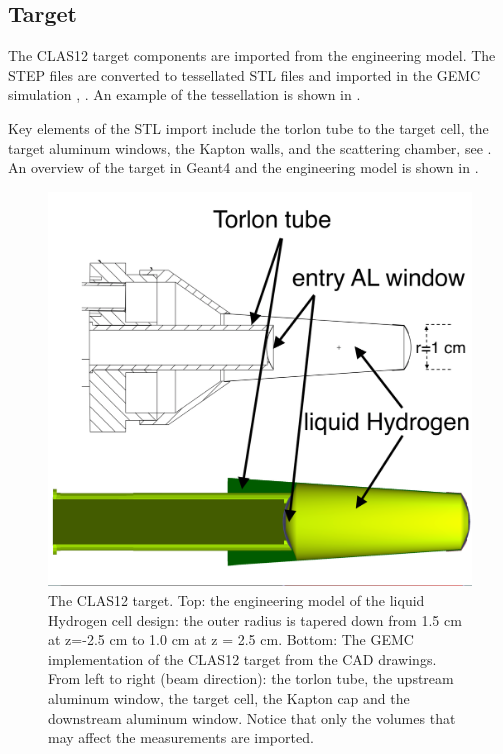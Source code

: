 \subsection{Target}

The CLAS12 target components are imported from the engineering model. The STEP files are converted to tessellated STL files and imported
in the GEMC simulation \cite{targetCorrection}, \cite{targetStudy}. An example of the tessellation is shown in .

Key elements of the STL import include the torlon tube to the target cell,
the target aluminum windows, the Kapton walls, and the scattering chamber, see .
An overview of the target in Geant4 and the engineering model is shown in .

\begin{figure}
	\centering
	\includegraphics[width=0.99\columnwidth,keepaspectratio]{img/targetDesign.png}
	\caption{The CLAS12 target. Top: the engineering model of the liquid Hydrogen cell design: the outer radius is
             tapered down from 1.5 cm at z=-2.5 cm to 1.0 cm at z = 2.5 cm.
             Bottom: The GEMC implementation of the CLAS12 target from the CAD drawings. From left to right (beam direction):
             the torlon tube, the upstream aluminum window, the target cell, the Kapton cap and the
			 downstream aluminum window. Notice that only the volumes that may affect the measurements are imported.}
	\label{fig:targetDesign}
\end{figure}


